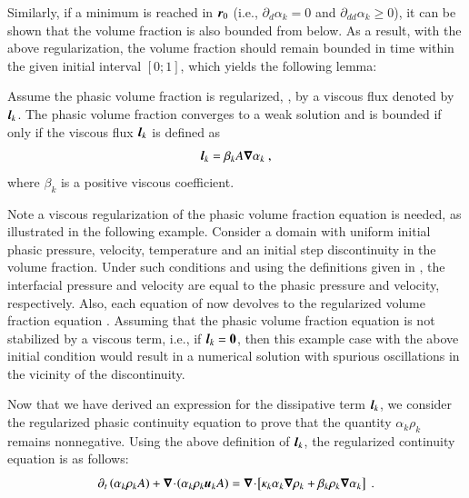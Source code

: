 Similarly, if a minimum is reached in $\boldsymbol r_0$ (i.e., $\partial_d \alpha_k = 0$ and $\partial_{dd} \alpha_k \geq 0$),
it can be shown that the volume fraction is also bounded from below. As a result, with the above regularization, the volume fraction
should remain bounded in time within the given initial interval $[0;1]$, which yields the following lemma:
%
\begin{lemma}\label{lmm:lemma-2}
Assume the phasic volume fraction is regularized, , by a viscous flux denoted by $\boldsymbol l_k$. The phasic volume fraction converges to a weak solution 
and is bounded if only if the viscous flux  $\boldsymbol l_k$ is defined as 
\begin{equation}
\boldsymbol l_k = \beta_k A \boldsymbol\nabla \alpha_k \ , \nonumber
\end{equation}
where $\beta_k$ is a positive viscous coefficient.
\end{lemma}
%
\begin{my_remark}\label{rmq:rmq_vf_diss_term}
Note a viscous regularization of the phasic volume fraction equation is needed, as illustrated in the following example. Consider a 
domain with uniform initial phasic pressure, velocity, temperature and an initial step discontinuity in the volume fraction. Under such conditions and using the definitions given in , 
the interfacial pressure and velocity are equal to the phasic pressure and velocity, respectively. Also, each equation of  now 
devolves to the regularized volume fraction equation . Assuming that the phasic volume fraction equation is not stabilized by a viscous term, 
i.e., if $\boldsymbol l_k = \boldsymbol0$, then this example case with the above initial condition would result in a numerical solution with spurious oscillations in the vicinity of the discontinuity. 
\end{my_remark}
%
Now that we have derived an expression for the dissipative term $\boldsymbol l_k$, we consider the regularized phasic continuity equation to prove that the quantity 
$\alpha_k \rho_k$ remains nonnegative. Using the above definition of $\boldsymbol l_k$, the regularized continuity equation is as follows:
%
\begin{equation}\label{eq:reg-mass-equ-final}
\partial_t \left( \alpha_k \rho_k A \right) + \boldsymbol\nabla\! \cdot \! \left( \alpha_k \rho_k \boldsymbol u_k A \right) = \boldsymbol\nabla\! \cdot \! \left[ \kappa_k \alpha_k \boldsymbol\nabla \rho_k + \beta_k \rho_k \boldsymbol\nabla \alpha_k \right] \ .
\end{equation}

